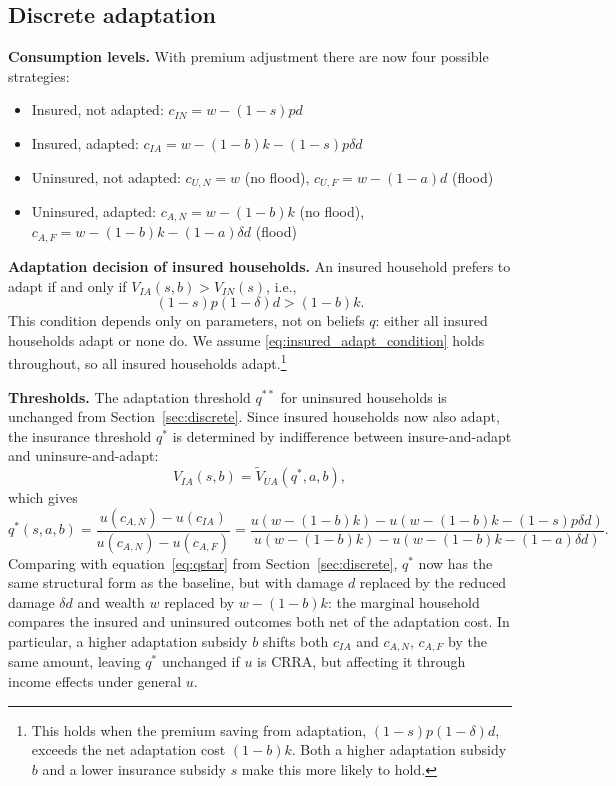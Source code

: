 \documentclass{article}
\begin{document}
\subsection{Discrete adaptation}

\textbf{Consumption levels.} With premium adjustment there are now four possible strategies:
\begin{itemize}
    \item Insured, not adapted: $c_{IN} = w - (1-s)pd$
    \item Insured, adapted: $c_{IA} = w - (1-b)k - (1-s)p\delta d$
    \item Uninsured, not adapted: $c_{U,N} = w$ (no flood), $c_{U,F} = w-(1-a)d$ (flood)
    \item Uninsured, adapted: $c_{A,N} = w-(1-b)k$ (no flood), $c_{A,F} = w-(1-b)k-(1-a)\delta d$ (flood)
\end{itemize}

\textbf{Adaptation decision of insured households.} An insured household prefers to adapt if and only if $V_{IA}(s,b) > V_{IN}(s)$, i.e.,
\begin{equation}
    (1-s)p(1-\delta)d > (1-b)k. \label{eq:insured_adapt_condition}
\end{equation}
This condition depends only on parameters, not on beliefs $q$: either all insured households adapt or none do. We assume \eqref{eq:insured_adapt_condition} holds throughout, so all insured households adapt.\footnote{This holds when the premium saving from adaptation, $(1-s)p(1-\delta)d$, exceeds the net adaptation cost $(1-b)k$. Both a higher adaptation subsidy $b$ and a lower insurance subsidy $s$ make this more likely to hold.}

\textbf{Thresholds.} The adaptation threshold $q^{**}$ for uninsured households is unchanged from Section~\ref{sec:discrete}. Since insured households now also adapt, the insurance threshold $q^*$ is determined by indifference between insure-and-adapt and uninsure-and-adapt:
\begin{equation}
    V_{IA}(s,b) = \tilde{V}_{UA}(q^*,a,b),
\end{equation}
which gives
\begin{equation}
    q^*(s,a,b) = \frac{u(c_{A,N}) - u(c_{IA})}{u(c_{A,N}) - u(c_{A,F})}
    = \frac{u(w-(1-b)k)-u(w-(1-b)k-(1-s)p\delta d)}{u(w-(1-b)k)-u(w-(1-b)k-(1-a)\delta d)}.
    \label{eq:qstar_premium}
\end{equation}
Comparing with equation~\eqref{eq:qstar} from Section~\ref{sec:discrete}, $q^*$ now has the same structural form as the baseline, but with damage $d$ replaced by the reduced damage $\delta d$ and wealth $w$ replaced by $w-(1-b)k$: the marginal household compares the insured and uninsured outcomes both net of the adaptation cost. In particular, a higher adaptation subsidy $b$ shifts both $c_{IA}$ and $c_{A,N}$, $c_{A,F}$ by the same amount, leaving $q^*$ unchanged if $u$ is CRRA, but affecting it through income effects under general $u$.
\end{document}
